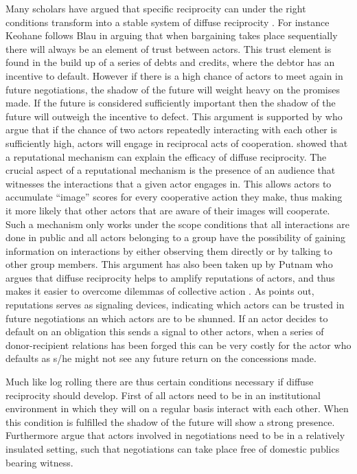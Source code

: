 Many scholars have argued that specific reciprocity can under the right conditions transform into a stable system of diffuse reciprocity \citep{Gouldner1960,Axelrod1986,Keohane1986,NowakSigmund1998,Diekmann2004}. For instance Keohane follows Blau in arguing that when bargaining takes place sequentially there will always be an element of trust between actors. This trust element is found in the build up of a series of debts and credits, where the debtor has an incentive to default. However if there is a high chance of actors to meet again in future negotiations, the shadow of the future will weight heavy on the promises made. If the future is considered sufficiently important then the shadow of the future will outweigh the incentive to defect. This argument is supported by \citet{FehrFischbacherGachter2002} who argue that if the chance of two actors repeatedly interacting with each other is sufficiently high, actors will engage in reciprocal acts of cooperation. \citet{NowakSigmund1998} showed that a reputational mechanism can explain the efficacy of diffuse reciprocity. The crucial aspect of a reputational mechanism is the presence of an audience that witnesses the interactions that a given actor engages in. This allows actors to accumulate ``image'' scores for every cooperative action they make, thus making it more likely that other actors that are aware of their images will cooperate. Such a mechanism only works under the scope conditions that all interactions are done in public and all actors belonging to a group  have the possibility of gaining information on interactions by either observing them directly or by talking to other group members. This argument has also been taken up by Putnam who argues that diffuse reciprocity helps to amplify reputations of actors, and thus makes it easier to overcome dilemmas of collective action \citep{Putnam1995}. As \citet{Axelrod1986} points out, reputations serves as signaling devices, indicating which actors can be trusted in future negotiations an which actors are to be shunned. If an actor decides to default on an obligation this sends a signal to other actors, when a series of donor-recipient relations has been forged this can be very costly for the actor who defaults as s/he might not see any future return on the concessions made.    

Much like log rolling there are thus certain conditions necessary if diffuse reciprocity should develop. First of all actors need to be in an institutional environment in which they will on a regular basis interact with each other. When this condition is fulfilled the shadow of the future will show a strong presence. Furthermore \citet{Lewis2005} argue that actors involved in negotiations need to be in a relatively insulated setting, such that negotiations can take place free of domestic publics bearing witness. 

